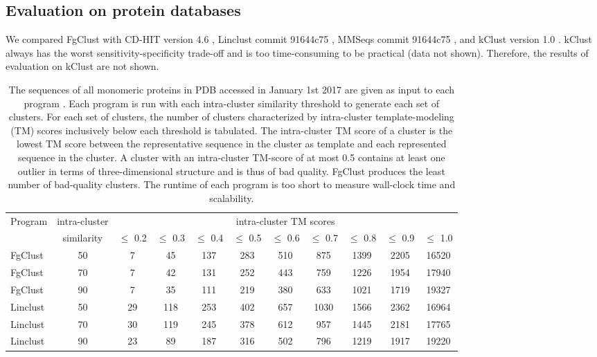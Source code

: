 \documentclass[11pt,letterpaper]{article}
\begin{document}
\subsection{Evaluation on protein databases}

We compared FgClust with CD-HIT version 4.6 \citep{fu2012cd}, Linclust commit 91644c75 \citep{steinegger2017linclust}, MMSeqs commit 91644c75 \citep{steinegger2017mmseqs2}, and kClust version 1.0 \citep{hauser2013kclust}. kClust always has the worst sensitivity-specificity trade-off and is too time-consuming to be practical (data not shown). Therefore, the results of evaluation on kClust are not shown.

\begin{table}%
	\centering
	\caption{
		The sequences of all monomeric proteins in PDB accessed in January 1st 2017 are given as input to each program \citep{berman2006protein}. 
		Each program is run with each intra-cluster similarity threshold to generate each set of clusters.
		For each set of clusters, the number of clusters characterized by intra-cluster template-modeling (TM) scores inclusively below each threshold is tabulated.
		The intra-cluster TM score of a cluster is the lowest TM score between the representative sequence in the cluster as template and each represented sequence in the cluster.
		A cluster with an intra-cluster TM-score of at most 0.5 contains at least one outlier in terms of three-dimensional structure and is thus of bad quality.
		FgClust produces the least number of bad-quality clusters.
		The runtime of each program is too short to measure wall-clock time and scalability.
	}
	\begin{tabular}{l c c c c c c c c c c}
		
		\toprule
		Program & intra-cluster & \multicolumn{9}{c}{intra-cluster TM scores} \\
		& similarity & 
		  \(\le\) 0.2 & \(\le\) 0.3 & \(\le\) 0.4 & \(\le\) 0.5 
		& \(\le\) 0.6 & \(\le\) 0.7 & \(\le\) 0.8 & \(\le\) 0.9 & \(\le\) 1.0 \\
		\midrule
		
		FgClust  & 50 & 7 & 45 & 137 & 283 & 510 & 875 & 1399 & 2205 & 16520 \\
		FgClust  & 70 & 7 & 42 & 131 & 252 & 443 & 759 & 1226 & 1954 & 17940 \\
		FgClust  & 90 & 7 & 35 & 111 & 219 & 380 & 633 & 1021 & 1719 & 19327 \\

		Linclust & 50 & 29 & 118 & 253 & 402 & 657 & 1030 & 1566 & 2362 & 16964 \\
		Linclust & 70 & 30 & 119 & 245 & 378 & 612 & 957 & 1445 & 2181 & 17765 \\
		Linclust & 90 & 23 & 89 & 187 & 316 & 502 & 796 & 1219 & 1917 & 19220 \\
	

\end{tabular}
\end{table}
\end{document}
